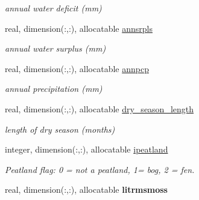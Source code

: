 \begin{DoxyCompactItemize}
\begin{DoxyCompactList}\small\item\em annual water deficit (mm) \end{DoxyCompactList}\item 
\hypertarget{structctem__statevars_1_1veg__rot_ad1db69ee1e43f03a80d02bd51d43f52f}{}real, dimension(\+:,\+:), allocatable \hyperlink{structctem__statevars_1_1veg__rot_ad1db69ee1e43f03a80d02bd51d43f52f}{annsrpls}\label{structctem__statevars_1_1veg__rot_ad1db69ee1e43f03a80d02bd51d43f52f}

\begin{DoxyCompactList}\small\item\em annual water surplus (mm) \end{DoxyCompactList}\item 
\hypertarget{structctem__statevars_1_1veg__rot_adddaa3516807e2d21d911472e98519a1}{}real, dimension(\+:,\+:), allocatable \hyperlink{structctem__statevars_1_1veg__rot_adddaa3516807e2d21d911472e98519a1}{annpcp}\label{structctem__statevars_1_1veg__rot_adddaa3516807e2d21d911472e98519a1}

\begin{DoxyCompactList}\small\item\em annual precipitation (mm) \end{DoxyCompactList}\item 
\hypertarget{structctem__statevars_1_1veg__rot_a19c005a95c8414f256fc02ce34f943e5}{}real, dimension(\+:,\+:), allocatable \hyperlink{structctem__statevars_1_1veg__rot_a19c005a95c8414f256fc02ce34f943e5}{dry\+\_\+season\+\_\+length}\label{structctem__statevars_1_1veg__rot_a19c005a95c8414f256fc02ce34f943e5}

\begin{DoxyCompactList}\small\item\em length of dry season (months) \end{DoxyCompactList}\item 
\hypertarget{structctem__statevars_1_1veg__rot_ab3960ab4acf824416fa9eaf5572613eb}{}integer, dimension(\+:,\+:), allocatable \hyperlink{structctem__statevars_1_1veg__rot_ab3960ab4acf824416fa9eaf5572613eb}{ipeatland}\label{structctem__statevars_1_1veg__rot_ab3960ab4acf824416fa9eaf5572613eb}

\begin{DoxyCompactList}\small\item\em Peatland flag\+: 0 = not a peatland, 1= bog, 2 = fen. \end{DoxyCompactList}\item 
\hypertarget{structctem__statevars_1_1veg__rot_a43b2c872d7dbcec041568350f2331e03}{}real, dimension(\+:,\+:), allocatable {\bfseries litrmsmoss}\label{structctem__statevars_1_1veg__rot_a43b2c872d7dbcec041568350f2331e03}


\end{DoxyCompactItemize}
